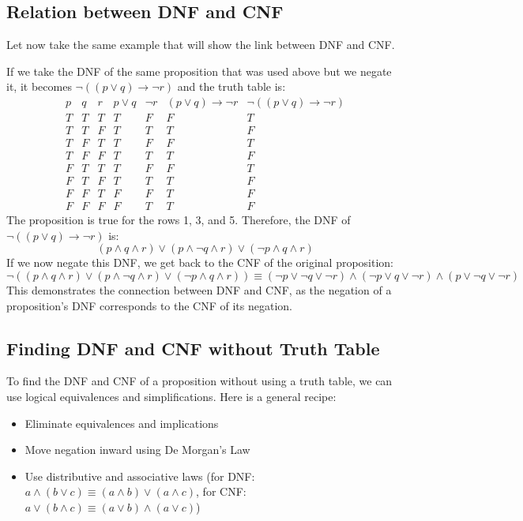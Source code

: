 \subsection{Relation between DNF and CNF}
Let now take the same example that will show the link between DNF and CNF.
\begin{eg}
    If we take the DNF of the same proposition that was used above but we negate it, it becomes $\neg ((p \lor q) \to \neg r)$ and the truth table is:
    \[
        \begin{array}{c|c|c|c|c|c|c}
            p & q & r & p \lor q & \neg r & (p \lor q) \to \neg r & \neg ((p \lor q) \to \neg r) \\
            \hline
            T & T & T & T & F & F & T \\
            T & T & F & T & T & T & F \\
            T & F & T & T & F & F & T \\
            T & F & F & T & T & T & F \\
            F & T & T & T & F & F & T \\
            F & T & F & T & T & T & F \\
            F & F & T & F & F & T & F \\
            F & F & F & F & T & T & F
        \end{array}
    \]
    The proposition is true for the rows 1, 3, and 5. Therefore, the DNF of $\neg ((p \lor q) \to \neg r)$ is:
    \[ (p \land q \land r) \lor (p \land \neg q \land r) \lor (\neg p \land q \land r) \]
    If we now negate this DNF, we get back to the CNF of the original proposition:
    \[ \neg ((p \land q \land r) \lor (p \land \neg q \land r) \lor (\neg p \land q \land r)) \equiv (\neg p \lor \neg q \lor \neg r) \land (\neg p \lor q \lor \neg r) \land (p \lor \neg q \lor \neg r) \]
    This demonstrates the connection between DNF and CNF, as the negation of a proposition’s DNF corresponds to the CNF of its negation.
\end{eg}

\subsection{Finding DNF and CNF without Truth Table}
To find the DNF and CNF of a proposition without using a truth table, we can use logical equivalences and simplifications. Here is a general recipe:
\begin{itemize}[itemsep=1pt,label=$\circ$]
    \item Eliminate equivalences and implications
    \item Move negation inward using De Morgan's Law
    \item Use distributive and associative laws (for DNF: $a \land (b \lor c) \equiv (a \land b) \lor (a \land c)$, for CNF: $a \lor (b \land c) \equiv (a \lor b) \land (a \lor c)$)
\end{itemize}

